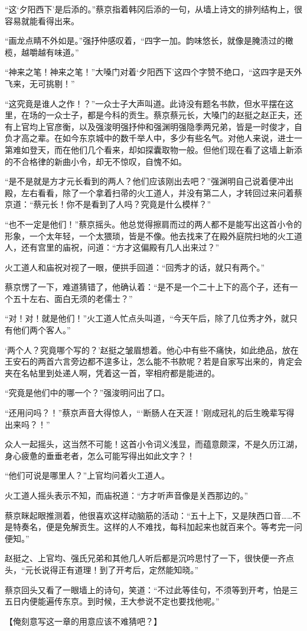 “这‘夕阳西下’是后添的。”蔡京指着韩冈后添的一句，从墙上诗文的排列结构上，很容易就能看得出来。

“画龙点睛不外如是。”强抒仲感叹着，“四字一加。韵味悠长，就像是腌渍过的橄榄，越嚼越有味道。”

“神来之笔！神来之笔！”大嗓门对着‘夕阳西下’这四个字赞不绝口，“这四字是天外飞来，无可挑剔！”

“这究竟是谁人之作！？”一众士子大声叫道。此诗没有题名书款，但水平摆在这里，在场的一众士子，都是今科的贡生。蔡京蔡元长，大嗓门的赵挺之赵正夫，还有上官均上官彦衡，以及强浚明强抒仲和强渊明强隐季两兄弟，皆是一时俊才，自负才高之辈。在如今东京城中的数千举人中，多少有些名气。对他人来说，进士一第难如登天，而在他们几个看来，却如探囊取物一般。但他们现在看了这墙上新添的不合格律的新曲小令，却无不惊叹，自愧不如。

“是不是就是方才元长看到的两人？他们应该刚出去吧？”强渊明自己说着便冲出殿，左右看看，除了一个拿着扫帚的火工道人，并没有第二人，才转回过来问着蔡京道：“蔡元长！你不是看到了人吗？究竟是什么模样？”

“也不一定是他们！”蔡京摇头。他总觉得擦肩而过的两人都不是能写出这首小令的形象，一个太年轻，一个太猥琐，皆是不像。他去找来了在殿外庭院扫地的火工道人，还有宫里的庙祝，问道：“方才这偏殿有几人出来过？”

火工道人和庙祝对视了一眼，便拱手回道：“回秀才的话，就只有两个。”

蔡京愣了一下，难道猜错了，他确认着：“是不是一个二十上下的高个子，还有一个五十左右、面白无须的老儒士？”

“对！对！就是他们！”火工道人忙点头叫道，“今天午后，除了几位秀才外，就只有他们两个客人。”

‘两个人？究竟哪个写的？’赵挺之皱眉想着。他心中有些不痛快，如此绝品，放在王安石的两首六言旁边都不遑多让，怎么能不书款呢？若是自家写出来的，肯定会夹在名帖里到处递人啊，凭着这一首，宰相府都是能进的。

“究竟是他们中的哪一个？”强浚明问出了口。

“还用问吗？！”蔡京声音大得惊人，“‘断肠人在天涯！’刚成冠礼的后生晚辈写得出来吗？！”

众人一起摇头，这当然不可能！这首小令词义浅显，而蕴意颇深，不是久历江湖，身心疲惫的垂垂老者，怎么可能写得出如此文字？！

“他们可说是哪里人？”上官均问着火工道人。

火工道人摇头表示不知，而庙祝道：“方才听声音像是关西那边的。”

蔡京眯起眼推测着，他很喜欢这样动脑筋的活动：“五十上下，又是陕西口音……不是特奏名，便是免解贡生。这样的人不难找，每科加起来也就百来个。等考完一问便知。”

赵挺之、上官均、强氏兄弟和其他几人听后都是沉吟思忖了一下，很快便一齐点头，“元长说得正有道理！到了开考后，定然能知晓。”

蔡京回头又看了一眼墙上的诗句，笑道：“不过此等佳句，不须等到开考，怕是三五日内便能遍传东京。到时候，王大参说不定也要找他呢。”

【俺刻意写这一章的用意应该不难猜吧？】

